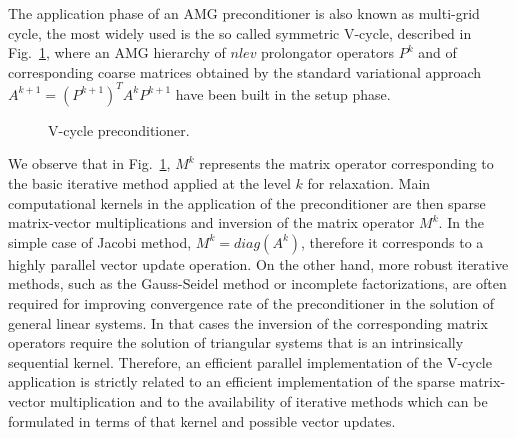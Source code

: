 The application phase of an AMG preconditioner is also known as
multi-grid cycle, the most widely used is the so called symmetric
V-cycle, described in Fig.~\ref{Vcycle}, where an AMG hierarchy of
$nlev$ prolongator operators $P^k$ and of corresponding coarse
matrices obtained by the standard variational approach
$A^{k+1}=(P^{k+1})^TA^kP^{k+1}$ have been built in the setup
phase. 
\begin{figure}[t]
\begin{center}
\caption{V-cycle preconditioner.\label{Vcycle}}
\end{center}
\end{figure}

We observe that in Fig.~\ref{Vcycle}, $M^k$ represents the matrix
operator corresponding to the basic iterative method applied at the
level $k$ for relaxation. 
Main computational kernels in the application of the preconditioner
are then sparse matrix-vector multiplications and inversion of the
matrix operator $M^k$. In the simple case of Jacobi method,
$M^k=diag(A^k)$, therefore it corresponds to a highly parallel vector
update operation. On the other hand, more robust iterative methods,
such as the Gauss-Seidel method or incomplete factorizations, are
often required for improving convergence rate of the preconditioner in
the solution of general linear systems. In that cases the inversion of
the corresponding matrix operators require the solution of triangular
systems that is an intrinsically sequential kernel. Therefore, an
efficient parallel implementation of the V-cycle application is
strictly related to an efficient implementation of the sparse
matrix-vector multiplication and to the availability of iterative
methods which can be formulated in terms of that kernel and possible
vector updates. 
